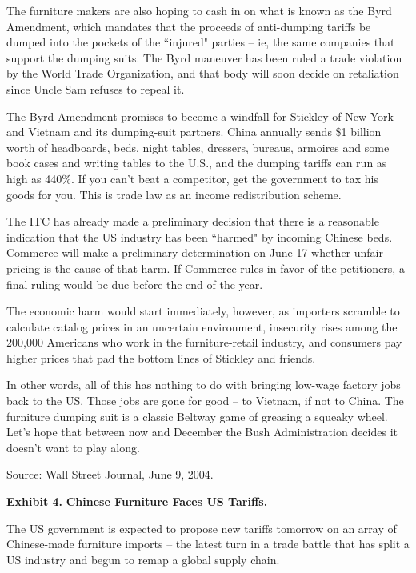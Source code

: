 \documentclass[letterpaper,12pt]{article}
\begin{document}
The furniture makers are also hoping to cash in on what is known as the Byrd Amendment, which mandates that the proceeds of anti-dumping tariffs be dumped into the pockets of the ``injured" parties -- ie, the same companies that support the dumping suits. The Byrd maneuver has been ruled a trade violation by the World Trade Organization, and that body will soon decide on retaliation since Uncle Sam refuses to repeal it.

The Byrd Amendment promises to become a windfall for Stickley of New York and Vietnam and its dumping-suit partners. China annually sends \$1 billion worth of headboards, beds, night tables, dressers, bureaus, armoires and some book cases and writing tables to the U.S., and the dumping tariffs can run as high as 440\%. If you can't beat a competitor, get the government to tax his goods for you. This is trade law as an income redistribution scheme.

The ITC has already made a preliminary decision that there is a reasonable indication that the US industry has been ``harmed" by incoming Chinese beds. Commerce will make a preliminary determination on June 17 whether unfair pricing is the cause of that harm. If Commerce rules in favor of the petitioners, a final ruling would be due before the end of the year.

The economic harm would start immediately, however, as importers scramble to calculate catalog prices in an uncertain environment, insecurity rises among the 200,000 Americans who work in the furniture-retail industry, and consumers pay higher prices that pad the bottom lines of Stickley and friends.

In other words, all of this has nothing to do with bringing low-wage factory jobs back to the US. Those jobs are gone for good -- to Vietnam, if not to China. The furniture dumping suit is a classic Beltway game of greasing a squeaky wheel. Let's hope that between now and December the Bush Administration decides it doesn't want to play along.

Source:  Wall Street Journal, June 9, 2004.  


\pagebreak%
{\bf Exhibit 4.} {\bf Chinese Furniture Faces US Tariffs.} 

The US government is expected to propose new tariffs tomorrow on an array of Chinese-made furniture imports -- the latest turn in a trade battle that has split a US industry and begun to remap a global supply chain.
\end{document}
